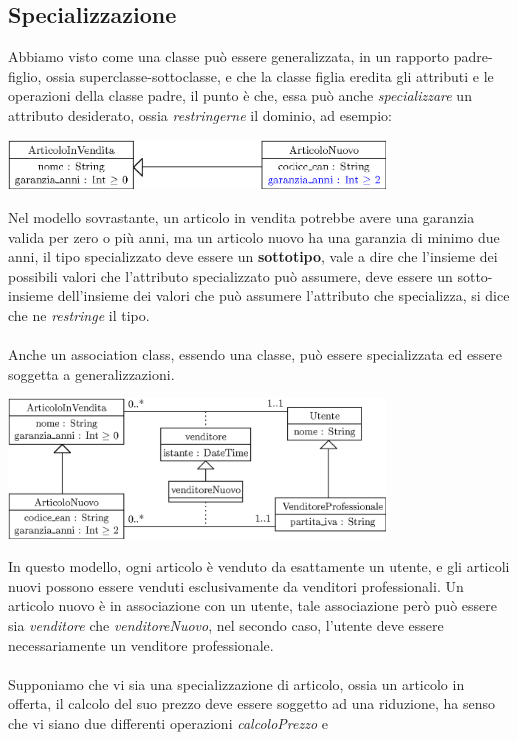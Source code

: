 \documentclass[12pt, letterpaper]{article}
\newcommand{\acc}{\\\hphantom{}\\}
\begin{document}
\subsection{Specializzazione}
Abbiamo visto come una classe può essere generalizzata, in un rapporto padre-figlio, ossia superclasse-sottoclasse, e 
che la classe figlia eredita gli attributi e le operazioni della classe padre, il punto è che, essa può anche 
\textit{specializzare} un attributo desiderato, ossia \textit{restringerne} il dominio, ad esempio:
\begin{center}
    \includegraphics[width=0.75\textwidth ]{images/specAttributo.eps}
\end{center}
Nel modello sovrastante, un articolo in vendita potrebbe avere una garanzia valida per zero o più anni, ma un articolo nuovo 
ha una garanzia di minimo due anni, il tipo specializzato deve essere un \textbf{sottotipo}, vale a dire che l'insieme 
dei possibili valori che l'attributo specializzato può assumere, deve essere un sotto-insieme dell'insieme dei valori che può 
assumere l'attributo che specializza, si dice che ne \textit{restringe} il tipo.\acc 
Anche un association class, essendo una classe, può essere specializzata ed essere soggetta a generalizzazioni.
\begin{center}
    \includegraphics[width=0.75\textwidth ]{images/specAssociazione.eps}
\end{center}
In questo modello, ogni articolo è venduto da esattamente un utente, e gli articoli nuovi possono essere venduti 
esclusivamente da venditori professionali. Un articolo nuovo è in associazione con un utente, tale associazione però 
può essere sia \textit{venditore} che \textit{venditoreNuovo}, nel secondo caso, l'utente deve essere necessariamente 
un venditore professionale.\acc 
Supponiamo che vi sia una specializzazione di articolo, ossia un articolo in offerta, il calcolo del suo prezzo deve 
essere soggetto ad una riduzione, ha senso che vi siano due differenti operazioni \textit{calcoloPrezzo} e
\end{document}
